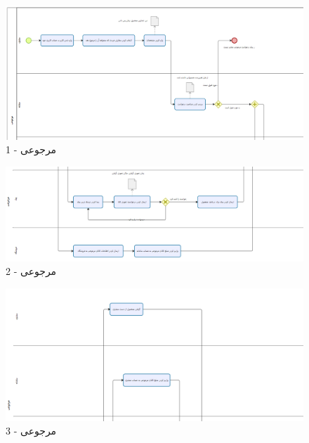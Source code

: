 \documentclass[12pt,a4paper]{article}
\begin{document}
	\begin{figure}[h!]
	\begin{center}
		\includegraphics[width=14cm]{images/Bizagi Return 1.png}	
	\end{center}
	\caption{مرجوعی - 1}
\end{figure}
\begin{figure}[h!]
	\begin{center}
		\includegraphics[width=14cm]{images/Bizagi Return 2.png}	
	\end{center}
	\caption{مرجوعی - 2}
\end{figure}
\pagebreak
\begin{figure}[h!]
	\begin{center}
		\includegraphics[width=14cm]{images/Bizagi Return 3.png}	
	\end{center}
	\caption{مرجوعی - 3}
\end{figure}
\end{document}
